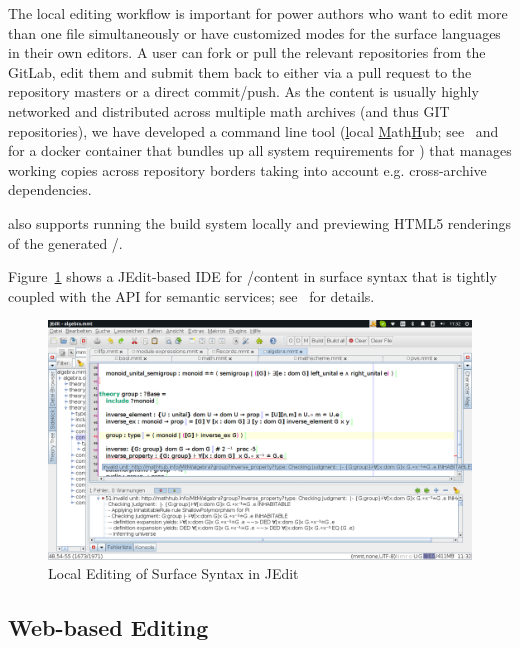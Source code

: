 The local editing workflow is important for power authors who want to edit more than one
file simultaneously or have customized modes for the surface languages in their own
editors. A user can fork or pull the relevant repositories from the \sys GitLab, edit them
and submit them back to \sys either via a pull request to the repository masters or a
direct commit/push. As the content is usually highly networked and distributed across
multiple math archives (and thus GIT repositories), we have developed a command line tool
\lmh (\underline{l}ocal \underline{M}ath\underline{H}ub; see~\cite{lmh:on}
and~\cite{lmh-docker:on} for a docker container that bundles up all system requirements
for \lmh) that manages working copies across repository borders taking into account e.g.
cross-archive dependencies. 

\lmh also supports running the build system locally and previewing HTML5 renderings of the
generated \omdoc/\mmt.

Figure~\ref{fig:jedit2} shows a JEdit-based IDE for \omdoc/\mmt content in \mmt surface
syntax that is tightly coupled with the \mmt API for semantic services;
see~\cite{Rabe:LII14} for details.

\begin{figure}[ht]\centering
  \includegraphics[width=15cm]{jedit2}
  \caption{Local Editing of \mmt Surface Syntax in JEdit}\label{fig:jedit2}
\end{figure}

\subsection{Web-based \sys Editing}\label{sec:web}

